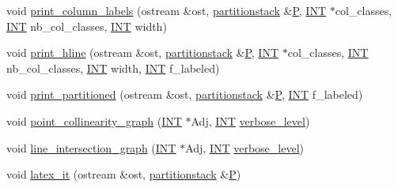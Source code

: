 \begin{DoxyCompactItemize}
\item 
void \mbox{\hyperlink{classincidence__structure_a16f15115fc99c128a90c824da2915700}{print\+\_\+column\+\_\+labels}} (ostream \&ost, \mbox{\hyperlink{classpartitionstack}{partitionstack}} \&\mbox{\hyperlink{simeon_8_c_a7fa15551e800919e93401fbbcd8e71e8}{P}}, \mbox{\hyperlink{galois_8h_a09fddde158a3a20bd2dcadb609de11dc}{I\+NT}} $\ast$col\+\_\+classes, \mbox{\hyperlink{galois_8h_a09fddde158a3a20bd2dcadb609de11dc}{I\+NT}} nb\+\_\+col\+\_\+classes, \mbox{\hyperlink{galois_8h_a09fddde158a3a20bd2dcadb609de11dc}{I\+NT}} width)
\item 
void \mbox{\hyperlink{classincidence__structure_ab973a717586b3a740a087b9c036a6b6e}{print\+\_\+hline}} (ostream \&ost, \mbox{\hyperlink{classpartitionstack}{partitionstack}} \&\mbox{\hyperlink{simeon_8_c_a7fa15551e800919e93401fbbcd8e71e8}{P}}, \mbox{\hyperlink{galois_8h_a09fddde158a3a20bd2dcadb609de11dc}{I\+NT}} $\ast$col\+\_\+classes, \mbox{\hyperlink{galois_8h_a09fddde158a3a20bd2dcadb609de11dc}{I\+NT}} nb\+\_\+col\+\_\+classes, \mbox{\hyperlink{galois_8h_a09fddde158a3a20bd2dcadb609de11dc}{I\+NT}} width, \mbox{\hyperlink{galois_8h_a09fddde158a3a20bd2dcadb609de11dc}{I\+NT}} f\+\_\+labeled)
\item 
void \mbox{\hyperlink{classincidence__structure_a9e18878f5cc9dbeca4806bd5aab5b054}{print\+\_\+partitioned}} (ostream \&ost, \mbox{\hyperlink{classpartitionstack}{partitionstack}} \&\mbox{\hyperlink{simeon_8_c_a7fa15551e800919e93401fbbcd8e71e8}{P}}, \mbox{\hyperlink{galois_8h_a09fddde158a3a20bd2dcadb609de11dc}{I\+NT}} f\+\_\+labeled)
\item 
void \mbox{\hyperlink{classincidence__structure_a86b9bdb4481941c837f9cf21da0f7a90}{point\+\_\+collinearity\+\_\+graph}} (\mbox{\hyperlink{galois_8h_a09fddde158a3a20bd2dcadb609de11dc}{I\+NT}} $\ast$Adj, \mbox{\hyperlink{galois_8h_a09fddde158a3a20bd2dcadb609de11dc}{I\+NT}} \mbox{\hyperlink{simeon_8_c_a818073fbcc2f439e7c56952f67386122}{verbose\+\_\+level}})
\item 
void \mbox{\hyperlink{classincidence__structure_a477ba3c41db7791eda9ddc85fa2de273}{line\+\_\+intersection\+\_\+graph}} (\mbox{\hyperlink{galois_8h_a09fddde158a3a20bd2dcadb609de11dc}{I\+NT}} $\ast$Adj, \mbox{\hyperlink{galois_8h_a09fddde158a3a20bd2dcadb609de11dc}{I\+NT}} \mbox{\hyperlink{simeon_8_c_a818073fbcc2f439e7c56952f67386122}{verbose\+\_\+level}})
\item 
void \mbox{\hyperlink{classincidence__structure_a7ad3d823093d5938d41c36230b9b8ea6}{latex\+\_\+it}} (ostream \&ost, \mbox{\hyperlink{classpartitionstack}{partitionstack}} \&\mbox{\hyperlink{simeon_8_c_a7fa15551e800919e93401fbbcd8e71e8}{P}})

\end{DoxyCompactItemize}
